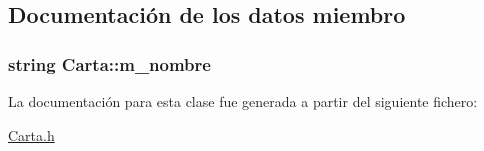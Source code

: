 \subsection{Documentación de los datos miembro}
\hypertarget{class_carta_a856e3d101b14062a989f23265ae1d46b}{
\subsubsection[{m\-\_\-nombre}]{\setlength{\rightskip}{0pt plus 5cm}string Carta\-::m\-\_\-nombre\hspace{0.3cm}{\ttfamily [protected]}}}\label{class_carta_a856e3d101b14062a989f23265ae1d46b}


La documentación para esta clase fue generada a partir del siguiente fichero\-:\begin{DoxyCompactItemize}
\item 
\hyperlink{_carta_8h}{Carta.\-h}\end{DoxyCompactItemize}

